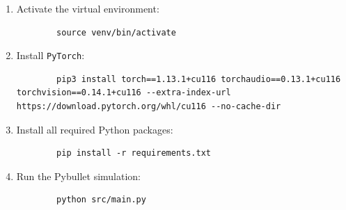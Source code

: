 \documentclass[11pt, a4paper]{report}
\begin{document}
\begin{enumerate}
    \item Activate the virtual environment:
    \begin{lstlisting}
        source venv/bin/activate
    \end{lstlisting}

    \item Install \verb|PyTorch|:
    \begin{lstlisting}
        pip3 install torch==1.13.1+cu116 torchaudio==0.13.1+cu116 torchvision==0.14.1+cu116 --extra-index-url https://download.pytorch.org/whl/cu116 --no-cache-dir
    \end{lstlisting}

    \item Install all required Python packages:
    \begin{lstlisting}
        pip install -r requirements.txt
    \end{lstlisting}

    \item Run the Pybullet simulation:
    \begin{lstlisting}
        python src/main.py
    \end{lstlisting}
\end{enumerate}
\end{document}
